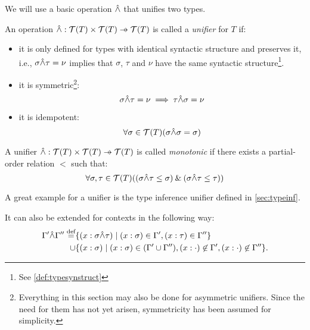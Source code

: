 \documentclass[main.tex]{subfiles}
\begin{document}
We will use a basic operation $\hat{\wedge}$ that unifies two types.

\begin{defn}
    An operation $ \unify : \tclos{T} \times \tclos{T} \pfun \tclos{T}$ is
    called a \emph{unifier} for $T$ if:
    \begin{itemize}
        \item it is only defined for types with identical syntactic structure and
            preserves it, i.e., $\sigma \hat{\wedge} \tau = \nu$ implies that $\sigma$,
            $\tau$ and $\nu$ have the same syntactic structure\footnote{
                See \cref{def:typesynstruct}
            }.

        \item it is symmetric\footnote{
                Everything in this section may also be done for asymmetric unifiers.
                Since the need for them has not yet arisen, symmetricity has been
                assumed for simplicity.
            }:
            \[ \sigma \hat{\wedge} \tau = \nu \implies \tau \hat{\wedge} \sigma = \nu \]

        \item it is idempotent:
            \[ \forall \sigma \in \mathcal{T}( T ) (\sigma \hat{\wedge} \sigma = \sigma) \]
    \end{itemize}
\end{defn}

\begin{defn}
    A unifier $ \unify : \tclos{T} \times \tclos{T} \pfun \tclos{T}$ is called
    \emph{monotonic} if there exists a partial-order relation $\less$ such that:
    \[ \forall \sigma, \tau \in \mathcal{T}( T )
        ((\sigma \hat{\wedge} \tau \leq \sigma) \mathbin{\&} (\sigma \hat{\wedge} \tau \leq \tau)) \]
\end{defn}

A great example for a unifier is the type inference unifier defined in
\cref{sec:typeinf}.


It can also be extended for contexts in the following way:
\[
    \begin{split}
        \Gamma' \hat{\wedge} \Gamma'' \overset{\text{\scriptsize def}}{=}
        &\{ (x : \sigma \hat{\wedge} \tau) \mid (x : \sigma) \in \Gamma', (x : \tau) \in \Gamma''\} \\
        \cup &
        \{ (x : \sigma) \mid (x : \sigma) \in (\Gamma' \cup \Gamma''),
            (x : \cdot) \not\in \Gamma',
            (x : \cdot) \not\in \Gamma'' \}. \\
    \end{split}
\]
\end{document}
